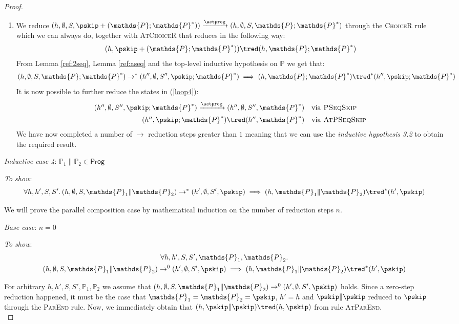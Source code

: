 \begin{thm}
{\begin{proof}
\begin{enumerate}
	\item We reduce $(h, \emptyset, S, \pskip + (\mathds{P} ; \mathds{P}^*)) \xrightarrow{\actprog} (h, \emptyset, S, \mathds{P} ; \mathds{P}^*)$ through the \textsc{ChoiceR} rule which we can always do, together with \textsc{AtChoiceR} that reduces in the following way:
	\[
		(h, \pskip + (\mathds{P} ; \mathds{P}^*)) \tred (h, \mathds{P} ; \mathds{P}^*)
	\]
	From Lemma \ref{ref:2seq}, Lemma \ref{ref:aseq} and the top-level inductive hypothesis on $\mathds{P}$ we get that:
	\begin{gather}
		\label{loop4}
		(h, \emptyset, S, \mathds{P} ; \mathds{P}^*) \rightarrow^* (h'', \emptyset, S'', \pskip ; \mathds{P}^*) \implies (h, \mathds{P} ; \mathds{P}^*) \tred^* (h'', \pskip ; \mathds{P}^*)
	\end{gather}
	It is now possible to further reduce the states in (\ref{loop4}):
	\[
		\begin{array}{r l}
			(h'', \emptyset, S'', \pskip ; \mathds{P}^*) \xrightarrow{\actprog} (h'', \emptyset, S'', \mathds{P}^*)
			&
			\text{via \textsc{PSeqSkip}}
			\\[0.5em]
			(h'', \pskip ; \mathds{P}^*) \tred (h'', \mathds{P}^*)
			&
			\text{via \textsc{AtPSeqSkip}}
		\end{array}
	\]
	We have now completed a number of $\rightarrow$ reduction steps greater than $1$ meaning that we can use the \textit{inductive hypothesis 3.2} to obtain the required result.
\end{enumerate}
\indline
\textit{Inductive case 4}: $\mathds{P}_1 \| \mathds{P}_2 \in \mathsf{Prog}$

\textit{To show}:
\[
	\forall h, h', S, S' \ldotp
	(h, \emptyset, S, \mathds{P}_1 \| \mathds{P}_2) \rightarrow^* (h', \emptyset, S', \pskip) \implies 
	(h, \mathds{P}_1 \| \mathds{P}_2 ) \tred^* (h', \pskip)
\]

We will prove the parallel composition case by mathematical induction on the number of reduction steps $n$.

\textit{Base case}: $n = 0$

\textit{To show}:
\begin{gather*}
	\forall h, h', S, S', \mathds{P}_1, \mathds{P}_2 \ldotp \\
	(h, \emptyset, S, \mathds{P}_1 \| \mathds{P}_2) \rightarrow^0 (h', \emptyset, S', \pskip)
	\implies
	(h, \mathds{P}_1 \| \mathds{P}_2) \tred^* (h', \pskip)
\end{gather*}

For arbitrary $h, h', S, S', \mathds{P}_1, \mathds{P}_2$ we assume that $(h, \emptyset, S, \mathds{P}_1 \| \mathds{P}_2) \rightarrow^0 (h', \emptyset, S', \pskip)$ holds. Since a zero-step reduction happened, it must be the case that $\mathds{P}_1 = \mathds{P}_2 = \pskip$, $h' = h$ and $\pskip \| \pskip$ reduced to $\pskip$ through the \textsc{ParEnd} rule. Now, we immediately obtain that $(h, \pskip \| \pskip) \tred (h, \pskip)$ from rule \textsc{AtParEnd}. \\


\end{proof}}
\end{thm}
